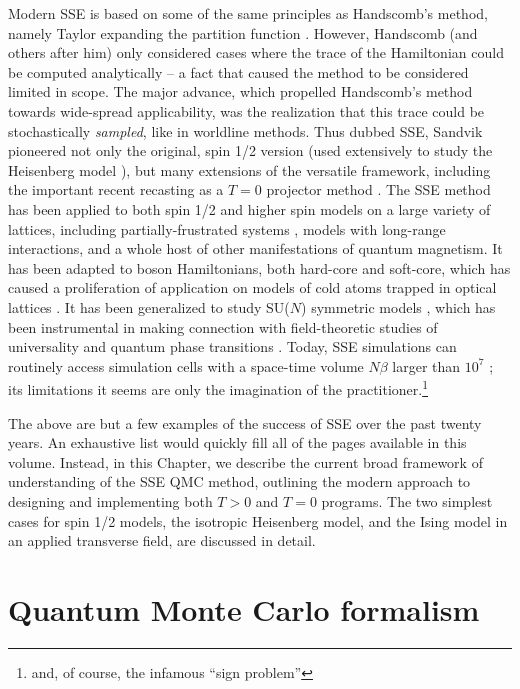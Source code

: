 \documentclass[vecphys]{svmult}
\begin{document}
Modern SSE is based on some of the same principles as Handscomb's method, namely Taylor expanding the partition function \cite{Melko:Handscomb62}.  However, Handscomb (and others after him) only considered cases where the trace of the Hamiltonian could be computed analytically --  a fact that caused the method to be considered limited in scope.
The major advance, which propelled Handscomb's method towards wide-spread applicability, was the realization that this trace could be stochastically {\em sampled}, like in worldline methods.
Thus dubbed SSE, Sandvik \cite{Melko:Sandvik91,Melko:Sandvik92} pioneered not only the original, spin 1/2 version (used extensively to study the Heisenberg model \cite{Melko:SandvikHeis}), but many extensions of the versatile framework, including the important recent recasting as a $T=0$ projector method \cite{Melko:Sandvik05,Melko:Beach06}.  The SSE method has been applied to both spin 1/2 and higher spin models \cite{Melko:Sandvik91,Melko:Henel} on a large variety of lattices, including partially-frustrated systems \cite{Melko:Melko07}, models with long-range interactions\cite{Melko:Sandvik03}, and a whole host of other manifestations of quantum magnetism.  It has been adapted to boson Hamiltonians, both hard-core and soft-core, which has caused a proliferation of application on models of cold atoms trapped in optical lattices \cite{Melko:Wessel04,Melko:CA3,Melko:CA2}.  It has been generalized to study SU($N$) symmetric models \cite{Melko:harada2003:sun,Melko:Kawashima07}, which has been instrumental in making connection with field-theoretic studies of universality and quantum phase transitions \cite{Melko:kaul2011:j1j2,Melko:Designer}.  Today, SSE simulations can routinely access simulation cells with a space-time volume $N\beta$ larger than $10^7$ \cite{Melko:Sandvik10c};  its limitations it seems are only the imagination of the practitioner.\footnote{and, of course, the infamous ``sign problem''}

The above are but a few examples of the success of SSE over the past twenty years.  An exhaustive list would quickly fill all of the pages available in this volume.  Instead, in this Chapter, we describe the current broad framework of understanding of the SSE QMC method, outlining the modern approach to designing and implementing both $T>0$ and $T=0$ programs.  The two simplest cases for spin 1/2 models, the isotropic Heisenberg model, and the Ising model in an applied transverse field, are discussed in detail.  

\section{Quantum Monte Carlo formalism}
\end{document}
